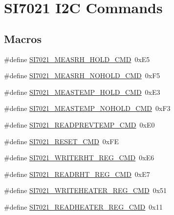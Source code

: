 \hypertarget{group__SI7021__I2C__CMD}{}\section{S\+I7021 I2C Commands}
\label{group__SI7021__I2C__CMD}
\subsection*{Macros}
\begin{DoxyCompactItemize}
\item 
\#define \hyperlink{group__SI7021__I2C__CMD_ga999d78aa56f7bd9ce04bb52e691d6753}{S\+I7021\+\_\+\+M\+E\+A\+S\+R\+H\+\_\+\+H\+O\+L\+D\+\_\+\+C\+MD}~0x\+E5
\item 
\#define \hyperlink{group__SI7021__I2C__CMD_ga7982df3514be8aa0cfef6e87e0aa48b0}{S\+I7021\+\_\+\+M\+E\+A\+S\+R\+H\+\_\+\+N\+O\+H\+O\+L\+D\+\_\+\+C\+MD}~0x\+F5
\item 
\#define \hyperlink{group__SI7021__I2C__CMD_ga2afcdc38468c893701a91bbf41c3e3d5}{S\+I7021\+\_\+\+M\+E\+A\+S\+T\+E\+M\+P\+\_\+\+H\+O\+L\+D\+\_\+\+C\+MD}~0x\+E3
\item 
\#define \hyperlink{group__SI7021__I2C__CMD_gad008920c3e715fc4c63032daca3bc5b0}{S\+I7021\+\_\+\+M\+E\+A\+S\+T\+E\+M\+P\+\_\+\+N\+O\+H\+O\+L\+D\+\_\+\+C\+MD}~0x\+F3
\item 
\#define \hyperlink{group__SI7021__I2C__CMD_gaf69388821d62e94cccd567f8861743a3}{S\+I7021\+\_\+\+R\+E\+A\+D\+P\+R\+E\+V\+T\+E\+M\+P\+\_\+\+C\+MD}~0x\+E0
\item 
\#define \hyperlink{group__SI7021__I2C__CMD_gaf46ed75ac39abc8aa85a2f08f6eaf2fb}{S\+I7021\+\_\+\+R\+E\+S\+E\+T\+\_\+\+C\+MD}~0x\+FE
\item 
\#define \hyperlink{group__SI7021__I2C__CMD_gaec66f83a736566c680c195cad9f7cb7c}{S\+I7021\+\_\+\+W\+R\+I\+T\+E\+R\+H\+T\+\_\+\+R\+E\+G\+\_\+\+C\+MD}~0x\+E6
\item 
\#define \hyperlink{group__SI7021__I2C__CMD_ga39482cdbef1a96514a58d25c30cab869}{S\+I7021\+\_\+\+R\+E\+A\+D\+R\+H\+T\+\_\+\+R\+E\+G\+\_\+\+C\+MD}~0x\+E7
\item 
\#define \hyperlink{group__SI7021__I2C__CMD_gaf62a1fb7fe727aa31f52de3ce616e3a4}{S\+I7021\+\_\+\+W\+R\+I\+T\+E\+H\+E\+A\+T\+E\+R\+\_\+\+R\+E\+G\+\_\+\+C\+MD}~0x51
\item 
\#define \hyperlink{group__SI7021__I2C__CMD_ga3b1583b7a4599056347a0f8fea5349fa}{S\+I7021\+\_\+\+R\+E\+A\+D\+H\+E\+A\+T\+E\+R\+\_\+\+R\+E\+G\+\_\+\+C\+MD}~0x11
\item 

\end{DoxyCompactItemize}
